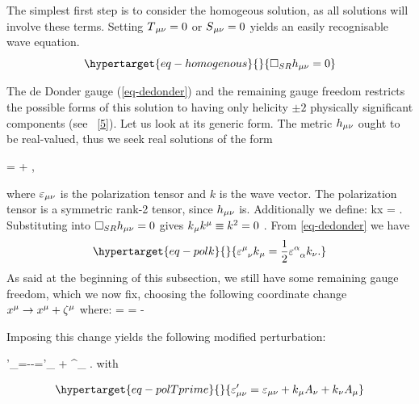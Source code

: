 \documentclass[
  10pt,
  a4paper,
  DIV=11,
  numbers=noendperiod,
  twoside]{scrreprt}
\let\[\relax \let\]\relax %
\DeclareRobustCommand{\[}{\begin{equation}}
\DeclareRobustCommand{\]}{\end{equation}}
\begin{document}
The simplest first step is to consider the homogeous solution, as all
solutions will involve these terms. Setting \(T{}_{\mu\nu}=0\) or \(S{}_{\mu\nu}=0\)
yields an easily recognisable wave equation.
\begin{equation}\protect\hypertarget{eq-homogenous}{}{
   \SRDA \weakmet = 0 
}\label{eq-homogenous}\end{equation}

The de Donder gauge (\ref{eq-dedonder}) and the remaining gauge
freedom restricts the
possible forms of this solution to having only helicity \(\pm2\)
physically significant components (see
~{[}\protect\hyperlink{ref-Weinberg:1972}{5}{]}). Let us look at its
generic form. The metric \(h{}_{\mu\nu}\) ought to be real-valued, thus we
seek real solutions of the form

\[
    \weakmet = \polco {} + \conjpolco {},
\]

where \(\varepsilon{}_{\mu\nu}\) is the polarization tensor and \(k\) is the wave
vector. The polarization tensor is a symmetric rank-2 tensor, since
\(h{}_{\mu\nu}\) is. Additionally we define: \[
    k\cdot x\equiv \mink {}  =  .
\] Substituting into \(\Box_{SR}h{}_{\mu\nu}=0\) gives
\(k{}_{\mu} k{}^{\mu} \equiv k^2=0\) . From \ref{eq-dedonder} we have
\begin{equation}\protect\hypertarget{eq-polk}{}{
    \polmix \co{k} = \frac{1}{2}\trpol k_\nu.
}\label{eq-polk}\end{equation} As said at the beginning of this
subsection, we still have some remaining gauge freedom, which we now
fix, choosing the following coordinate change
\(x{}^{\mu}\to x{}^{\mu}+\zeta{}^{\mu}\) where: \[
\ct{\zeta}=\im {}     =  - \im {} 
\]

Imposing this change yields the following modified perturbation:

\[
\weakTensor'_{\mu\nu}=\weakmet--=\polTensor'_{\mu\nu}  + \polTensor^{\prime\ast}{}_{\mu\nu} .
\] with

\begin{equation}\protect\hypertarget{eq-polTprime}{}{
\polTensor'_{\mu\nu} = \polco + \co{k}\co[\nu]{A} + \co[\nu]{k}\co{A}
}\label{eq-polTprime}\end{equation}
\end{document}
